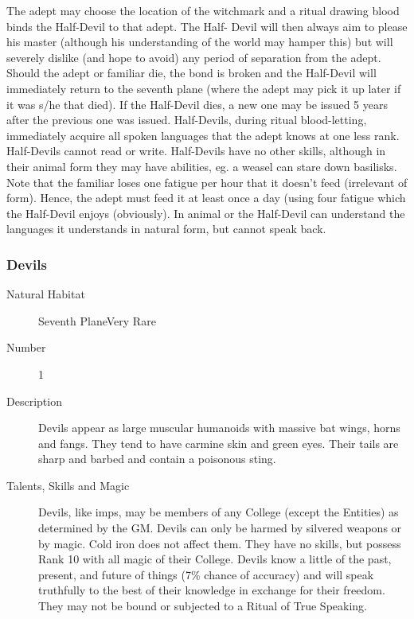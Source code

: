 \begin{multicols}{2}
\begin{description}
The adept may choose the location of the witchmark and a ritual
drawing blood binds the Half-Devil to that adept.  The Half- Devil
will then always aim to please his master (although his understanding
of the world may hamper this) but will severely dislike (and hope to
avoid) any period of separation from the adept.  Should the adept or
familiar die, the bond is broken and the Half-Devil will immediately
return to the seventh plane (where the adept may pick it up later if
it was s/he that died).  If the Half-Devil dies, a new one may be
issued 5 years after the previous one was issued.  Half-Devils, during
ritual blood-letting, immediately acquire all spoken languages that
the adept knows at one less rank.  Half-Devils cannot read or write.
Half-Devils have no other skills, although in their animal form they
may have abilities, eg.  a weasel can stare down basilisks.  Note that
the familiar loses one fatigue per hour that it doesn't feed
(irrelevant of form).  Hence, the adept must feed it at least once a
day (using four fatigue which the Half-Devil enjoys (obviously).  In
animal or the Half-Devil can understand the languages it understands
in natural form, but cannot speak back.

\end{description}

\subsubsection{Devils}

\begin{description}
\item[Natural Habitat]Seventh PlaneVery Rare

\item[Number] 1

\item[Description]Devils appear as large muscular humanoids with
massive bat wings, horns and fangs.  They tend to have carmine skin
and green eyes.  Their tails are sharp and barbed and contain a
poisonous sting.

\item[Talents, Skills and Magic]Devils, like imps, may be members of any College (except the
Entities) as determined by the GM. Devils can only be harmed by
silvered weapons or by magic.  Cold iron does not affect them.  They
have no skills, but possess Rank 10 with all magic of their College.
Devils know a little of the past, present, and future of things
(7\% chance of accuracy) and will speak truthfully to the best of
their knowledge in exchange for their freedom.  They may not be bound
or subjected to a Ritual of True Speaking.


\end{description}
\end{multicols}
